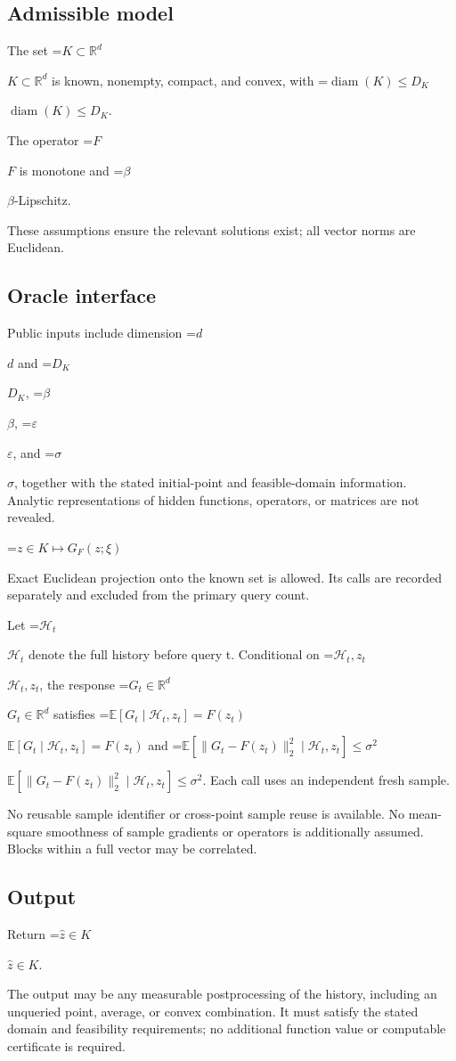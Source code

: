 \documentclass[10pt,a4paper]{article}
\newcommand{\AtlasMath}[1]{\par\begingroup\centering\setbox0=\hbox{$\displaystyle #1$}\ifdim\wd0>1.4\linewidth\typeout{ATLAS WIDE FORMULA: \the\wd0}\fi\ifdim\wd0>\linewidth\resizebox{\linewidth}{!}{\box0}\else\box0\fi\par\endgroup}
\newcommand{\AtlasInlineMath}[1]{\begingroup\setbox0=\hbox{$#1$}\ifdim\wd0>.4\linewidth\endgroup\AtlasMath{#1}\else\endgroup$#1$\fi}
\begin{document}
\subsection{Admissible model}
The set \AtlasInlineMath{K\subset\mathbb{R}^d} is known, nonempty, compact, and convex, with \AtlasInlineMath{\operatorname{diam}(K)\le D_K}.

The operator \AtlasInlineMath{F} is monotone and \AtlasInlineMath{\beta}-Lipschitz.

These assumptions ensure the relevant solutions exist; all vector norms are Euclidean.

\subsection{Oracle interface}
Public inputs include dimension \AtlasInlineMath{d} and \AtlasInlineMath{D_K}, \AtlasInlineMath{\beta}, \AtlasInlineMath{\varepsilon}, and \AtlasInlineMath{\sigma}, together with the stated initial-point and feasible-domain information. Analytic representations of hidden functions, operators, or matrices are not revealed.


\AtlasMath{z\in K\longmapsto G_F(z;\xi)}


Exact Euclidean projection onto the known set is allowed. Its calls are recorded separately and excluded from the primary query count.

Let \AtlasInlineMath{\mathcal H_t} denote the full history before query t. Conditional on \AtlasInlineMath{\mathcal H_t,z_t}, the response \AtlasInlineMath{G_t\in\mathbb R^d} satisfies \AtlasInlineMath{\mathbb E[G_t\mid\mathcal H_t,z_t]=F(z_t)} and \AtlasInlineMath{\mathbb E[\|G_t-F(z_t)\|_2^2\mid\mathcal H_t,z_t]\le\sigma^2}. Each call uses an independent fresh sample.

No reusable sample identifier or cross-point sample reuse is available. No mean-square smoothness of sample gradients or operators is additionally assumed. Blocks within a full vector may be correlated.

\subsection{Output}
Return \AtlasInlineMath{\widehat{z}\in K}.

The output may be any measurable postprocessing of the history, including an unqueried point, average, or convex combination. It must satisfy the stated domain and feasibility requirements; no additional function value or computable certificate is required.
\end{document}
